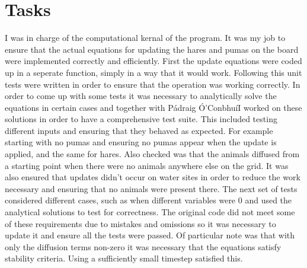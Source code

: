 \documentclass[12pt]{article}    %
\numberwithin{equation}{section}
\newcommand{\pa}{P\'{a}draig \'{O}'Conbhu\'{i}}
\begin{document}
\section{Tasks}
I was in charge of the computational kernal of the program.
It was my job to ensure that the actual equations for updating the hares and pumas on the board were implemented correctly and efficiently.
First the update equations were coded up in a seperate function, simply in a way that it would work.
Following this unit tests were written in order to ensure that the operation was working correctly.
In order to come up with some tests it was necessary to analytically solve the equations in certain cases and together with \pa I worked on these solutions in order to have a comprehensive test suite.
This included testing different inputs and ensuring that they behaved as expected.
For example starting with no pumas and ensuring no pumas appear when the update is applied, and the same for hares.
Also checked was that the animals diffused from a starting point when there were no animals anywhere else on the grid.
It was also ensured that updates didn't occur on water sites in order to reduce the work necessary and ensuring that no animals were present there.
The next set of tests considered different cases, such as when different variables were 0 and used the analytical solutions to test for correctness.
The original code did not meet some of these requirements due to mistakes and omissions so it was necessary to update it and ensure all the tests were passed.
Of particular note was that with only the diffusion terms non-zero it was necessary that the equations satisfy stability criteria.
Using a sufficiently small timestep satisfied this.
\end{document}
